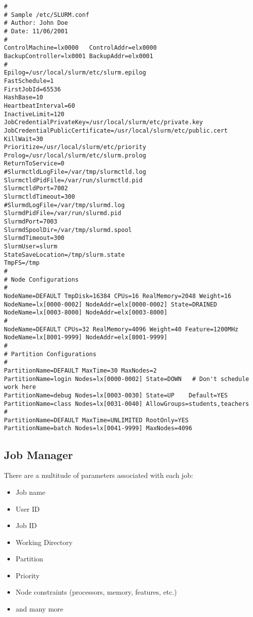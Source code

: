 \begin{verbatim}
# 
# Sample /etc/SLURM.conf
# Author: John Doe
# Date: 11/06/2001
#
ControlMachine=lx0000   ControlAddr=elx0000 
BackupController=lx0001 BackupAddr=elx0001
#
Epilog=/usr/local/slurm/etc/slurm.epilog
FastSchedule=1
FirstJobId=65536
HashBase=10
HeartbeatInterval=60
InactiveLimit=120
JobCredentialPrivateKey=/usr/local/slurm/etc/private.key
JobCredentialPublicCertificate=/usr/local/slurm/etc/public.cert
KillWait=30
Prioritize=/usr/local/slurm/etc/priority
Prolog=/usr/local/slurm/etc/slurm.prolog
ReturnToService=0
#SlurmctldLogFile=/var/tmp/slurmctld.log
SlurmctldPidFile=/var/run/slurmctld.pid
SlurmctldPort=7002
SlurmctldTimeout=300
#SlurmdLogFile=/var/tmp/slurmd.log
SlurmdPidFile=/var/run/slurmd.pid
SlurmdPort=7003
SlurmdSpoolDir=/var/tmp/slurmd.spool
SlurmdTimeout=300
SlurmUser=slurm
StateSaveLocation=/tmp/slurm.state
TmpFS=/tmp
#
# Node Configurations
#
NodeName=DEFAULT TmpDisk=16384 CPUs=16 RealMemory=2048 Weight=16
NodeName=lx[0000-0002] NodeAddr=elx[0000-0002] State=DRAINED
NodeName=lx[0003-8000] NodeAddr=elx[0003-8000]
#
NodeName=DEFAULT CPUs=32 RealMemory=4096 Weight=40 Feature=1200MHz
NodeName=lx[8001-9999] NodeAddr=elx[8001-9999]
#
# Partition Configurations
#
PartitionName=DEFAULT MaxTime=30 MaxNodes=2
PartitionName=login Nodes=lx[0000-0002] State=DOWN   # Don't schedule work here
PartitionName=debug Nodes=lx[0003-0030] State=UP    Default=YES
PartitionName=class Nodes=lx[0031-0040] AllowGroups=students,teachers
#
PartitionName=DEFAULT MaxTime=UNLIMITED RootOnly=YES
PartitionName=batch Nodes=lx[0041-9999] MaxNodes=4096
\end{verbatim}

\subsection{Job Manager}

There are a multitude of parameters associated with each job:
\begin{itemize}
\item Job name
\item User ID
\item Job ID
\item Working Directory
\item Partition
\item Priority
\item Node constraints (processors, memory, features, etc.)
\item and many more
\end{itemize}

